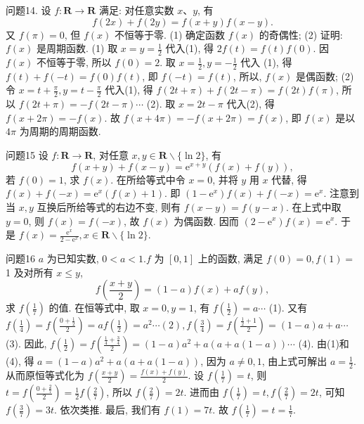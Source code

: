 问题14. 设 $f: \mathbf{R} \rightarrow \mathbf{R}$ 满足: 对任意实数 $x 、 y$, 有
$$
f(2 x)+f(2 y)=f(x+y) f(x-y) .
$$
又 $f(\pi)=0$, 但 $f(x)$ 不恒等于零.
(1) 确定函数 $f(x)$ 的奇偶性;
(2) 证明: $f(x)$ 是周期函数.
(1) 取 $x=y=\frac{1}{2}$ 代入(1), 得 $2 f(t)=f(t) f(0)$. 因 $f(x)$ 不恒等于零, 所以 $f(0)=2$. 取 $x=\frac{1}{2}, y=-\frac{1}{2}$ 代入 (1), 得 $f(t)+f(-t)= f(0) f(t)$, 即 $f(-t)=f(t)$, 所以, $f(x)$ 是偶函数; 
(2) 令 $x=t+\frac{\pi}{2}, y= t-\frac{\pi}{2}$ 代入(1), 得 $f(2 t+\pi)+f(2 t-\pi)=f(2 t) f(\pi)$, 所以 $f(2 t+\pi)= -f(2 t-\pi) \cdots$ (2). 取 $x=2 t-\pi$ 代入(2), 得 $f(x+2 \pi)=-f(x)$. 故 $f(x+ 4 \pi)=-f(x+2 \pi)=f(x)$, 即 $f(x)$ 是以 $4 \pi$ 为周期的周期函数.



问题15 设 $f: \mathbf{R} \rightarrow \mathbf{R}$, 对任意 $x, y \in \mathbf{R} \backslash\{\ln 2\}$, 有
$$
f(x+y)+f(x-y)=\mathrm{e}^{x+y}(f(x)+f(y)),
$$
若 $f(0)=1$, 求 $f(x)$.
在所给等式中令 $x=0$, 并将 $y$ 用 $x$ 代替, 得 $f(x)+f(-x)= \mathrm{e}^x(f(x)+1)$. 即 $\left(1-\mathrm{e}^x\right) f(x)+f(-x)=\mathrm{e}^x$. 注意到当 $x, y$ 互换后所给等式的右边不变, 则有 $f(x-y)=f(y-x)$. 在上式中取 $y=0$, 则 $f(x)=f(-x)$, 故 $f(x)$ 为偶函数.
因而 $\left(2-\mathrm{e}^x\right) f(x)=\mathrm{e}^x$. 于是 $f(x)=\frac{\mathrm{e}^x}{2-\mathrm{e}^x}, x \in \mathbf{R} \backslash\{\ln 2\}$.



问题16 $a$ 为已知实数, $0<a<1 . f$ 为 $[0,1]$ 上的函数, 满足 $f(0)=0, f(1)=$ 1 及对所有 $x \leqslant y$,
$$
f\left(\frac{x+y}{2}\right)=(1-a) f(x)+a f(y),
$$
求 $f\left(\frac{1}{7}\right)$ 的值.
在恒等式中, 取 $x=0, y=1$, 有 $f\left(\frac{1}{2}\right)=a \cdots$ (1). 又有 $f\left(\frac{1}{4}\right)= f\left(\frac{0+\frac{1}{2}}{2}\right)=a f\left(\frac{1}{2}\right)=a^2 \cdots(2), f\left(\frac{3}{4}\right)=f\left(\frac{\frac{1}{2}+1}{2}\right)=(1-a) a+a \cdots$ (3). 因此, $f\left(\frac{1}{2}\right)=f\left(\frac{\frac{1}{4}+\frac{3}{4}}{2}\right)=(1-a) a^2+a(a+a(1-a)) \cdots$ (4). 由(1)和 (4), 得 $a=(1-a) a^2+a(a+a(1-a))$, 因为 $a \neq 0,1$, 由上式可解出 $a=\frac{1}{2}$.
从而原恒等式化为 $f\left(\frac{x+y}{2}\right)=\frac{f(x)+f(y)}{2}$. 设 $f\left(\frac{1}{7}\right)=t$, 则 $t= f\left(\frac{0+\frac{2}{7}}{2}\right)=\frac{1}{2} f\left(\frac{2}{7}\right)$, 所以 $f\left(\frac{2}{7}\right)=2 t$. 进而由 $f\left(\frac{1}{7}\right)=t, f\left(\frac{2}{7}\right)=2 t$, 可知 $f\left(\frac{3}{7}\right)=3 t$. 依次类推.
最后, 我们有 $f(1)=7 t$. 故 $f\left(\frac{1}{7}\right)=t=\frac{1}{7}$.



